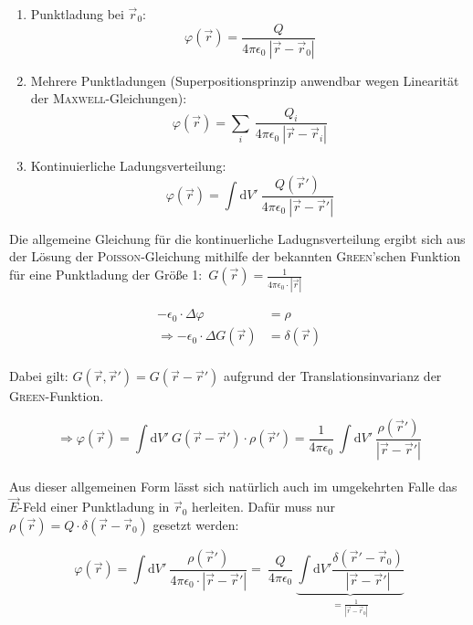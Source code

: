 \begin{enumerate}
\item Punktladung bei $\vec{r}_0$:
\begin{equation*}
\varphi(\vec{r}) = \frac{Q}{4\pi\epsilon_0 \ |\vec{r}-\vec{r}_0|}
\end{equation*}


\item Mehrere Punktladungen (Superpositionsprinzip anwendbar wegen Linearität der \textsc{Maxwell}-Gleichungen):
\begin{equation*}
\varphi(\vec{r}) = \sum\limits_i \ \frac{Q_i}{4\pi\epsilon_0 \ |\vec{r}-\vec{r}_i|}
\end{equation*}

\item Kontinuierliche Ladungsverteilung:
\begin{equation*}
\varphi(\vec{r}) = \int\mathrm{d}V' \ \frac{Q(\vec{r}')}{4\pi\epsilon_0 \ |\vec{r}-\vec{r}'|}
\end{equation*}
\end{enumerate}

Die allgemeine Gleichung für die kontinuerliche Ladugnsverteilung ergibt sich aus der Lösung der \textsc{Poisson}-Gleichung mithilfe der bekannten \textsc{Green}'schen Funktion für eine Punktladung der Größe 1:\ $G(\vec{r}) = \frac{1}{4\pi\epsilon_0 \cdot |\vec{r}|}$\

\begin{align*}
-\epsilon_0 \cdot \Delta \varphi &= \rho\\
\Rightarrow -\epsilon_0 \cdot \Delta G(\vec{r}) &= \delta(\vec{r})\\
\end{align*}

Dabei gilt: $G(\vec{r},\vec{r}') = G(\vec{r}-\vec{r}')$ aufgrund der Translationsinvarianz der \textsc{Green}-Funktion.

\begin{equation*}
\Rightarrow \varphi(\vec{r}) = \int\mathrm{d}V' \ G(\vec{r}-\vec{r}')\cdot\rho(\vec{r}') = \frac{1}{4\pi\epsilon_0} \ \int\mathrm{d}V' \ \frac{\rho(\vec{r}')}{|\vec{r}-\vec{r}'|}
\end{equation*}
\ \\

Aus dieser allgemeinen Form lässt sich natürlich auch im umgekehrten Falle das $\vec{E}$-Feld einer Punktladung in $\vec{r}_0$ herleiten. Dafür muss nur $\rho(\vec{r}) = Q\cdot\delta(\vec{r}-\vec{r}_0)$ gesetzt werden:

\begin{equation*}
\varphi(\vec{r}) = \int\mathrm{d}V' \ \frac{\rho(\vec{r}')}{4\pi\epsilon_0 \cdot |\vec{r}-\vec{r}'|} = \ \frac{Q}{4\pi\epsilon_0} \ \underbrace{\int\mathrm{d}V'\frac{\delta(\vec{r}'-\vec{r}_0)}{|\vec{r}-\vec{r}'|}}_{=\frac{1}{|\vec{r}-\vec{r}_0|}}
\end{equation*}

